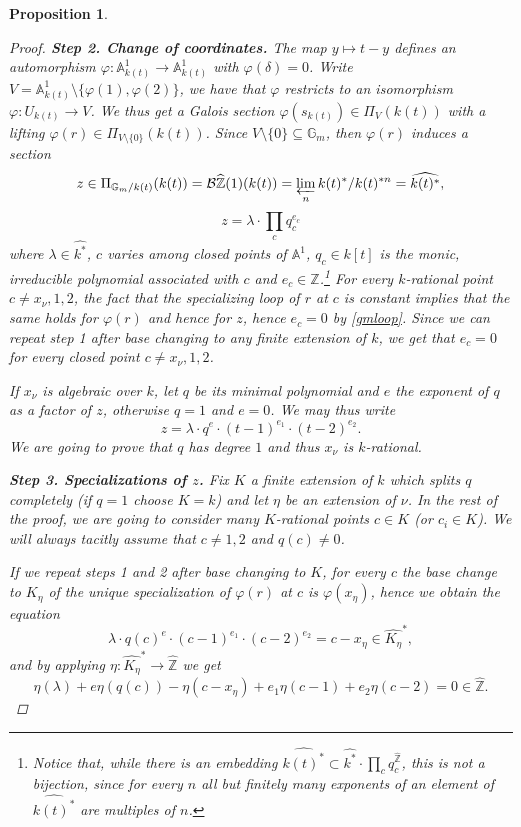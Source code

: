 \documentclass[11pt]{amsart}
\theoremstyle{plain}
\newtheorem{proposition}[theorem]{Proposition}
\theoremstyle{definition}
\newcommand{\1}{\mathbb{1}}
\newcommand{\A}{\mathbb{A}}
\newcommand{\G}{\mathbb{G}}
\newcommand{\hz}{\hat{\mathbb{Z}}}
\newcommand{\s}{\subseteq}
\renewcommand{\phi}{\varphi}
\renewcommand{\projlim}{\varprojlim}
\renewcommand{\hat}{\widehat}
\newcommand\cB{\mathcal{B}}
\begin{document}
\begin{proposition}
\begin{proof}
	
		\textbf{Step 2. Change of coordinates.} The map $y\mapsto t-y$ defines an automorphism $\phi:\A^{1}_{k(t)}\to\A^{1}_{k(t)}$ with $\phi(\delta)=0$. Write $V=\A^{1}_{k(t)}\setminus\{\phi(1),\phi(2)\}$, we have that $\phi$ restricts to an isomorphism $\phi:U_{k(t)}\to V$. We thus get a Galois section $\phi(s_{k(t)})\in\Pi_{V}(k(t))$ with a lifting $\phi(r)\in\Pi_{V\setminus \{0\}}(k(t))$. Since $V\setminus\{0\}\s\G_{m}$, then $\phi(r)$ induces a section
		\[z\in\Pi_{\G_{m}/k(t)}(k(t))=\cB\hz(1)(k(t))=\projlim_{n} k(t)^*/k(t)^{*n}=\hat{k(t)^*},\]
		\[z=\lambda\cdot\prod_{c}q_{c}^{e_{c}}\]
		where $\lambda\in\hat{k^*}$, $c$ varies among closed points of $\A^{1}$, $q_{c}\in k[t]$ is the monic, irreducible polynomial associated with $c$ and $e_{c}\in\hz$.\footnote{Notice that, while there is an embedding $\hat{k(t)^{*}}\subset \hat{k^{*}}\cdot\prod_{c}q_{c}^{\hz}$, this is not a bijection, since for every $n$ all but finitely many exponents of an element of $\hat{k(t)^{*}}$ are multiples of $n$.} For every $k$-rational point $c\neq x_{\nu},1,2$, the fact that the specializing loop of $r$ at $c$ is constant implies that the same holds for $\phi(r)$ and hence for $z$, hence $e_{c}=0$ by \autoref{gmloop}. Since we can repeat step 1 after base changing to any finite extension of $k$, we get that $e_{c}=0$ for every \emph{closed} point $c\neq x_{\nu},1,2$.
		
		If $x_{\nu}$ is algebraic over $k$, let $q$ be its minimal polynomial and $e$ the exponent of $q$ as a factor of $z$, otherwise $q=1$ and $e=0$. We may thus write
		\[z=\lambda\cdot q^{e}\cdot(t-1)^{e_{1}}\cdot(t-2)^{e_{2}}.\]
		We are going to prove that $q$ has degree $1$ and thus $x_{\nu}$ is $k$-rational.
		
		
		\textbf{Step 3. Specializations of $z$.} Fix $K$ a finite extension of $k$ which splits $q$ completely (if $q=1$ choose $K=k$) and let $\eta$ be an extension of $\nu$. In the rest of the proof, we are going to consider many $K$-rational points $c\in K$ (or $c_{i}\in K$). We will always tacitly assume that $c\neq 1,2$ and $q(c)\neq 0$.
		
		If we repeat steps 1 and 2 after base changing to $K$, for every $c$ the base change to $K_{\eta}$ of the unique specialization of $\phi(r)$ at $c$ is $\phi(x_{\eta})$, hence we obtain the equation
		\[\lambda\cdot q(c)^{e}\cdot(c-1)^{e_{1}}\cdot(c-2)^{e_{2}}=c-x_{\eta}\in\hat{K_{\eta}}^{*},\]
		and by applying $\eta:\hat{K_{\eta}}^{*}\to\hz$ we get
		\[\eta(\lambda)+e\eta(q(c))-\eta(c-x_{\eta})+e_{1}\eta(c-1)+e_{2}\eta(c-2)=0\in\hz.\]
		

\end{proof}
\end{proposition}
\end{document}
